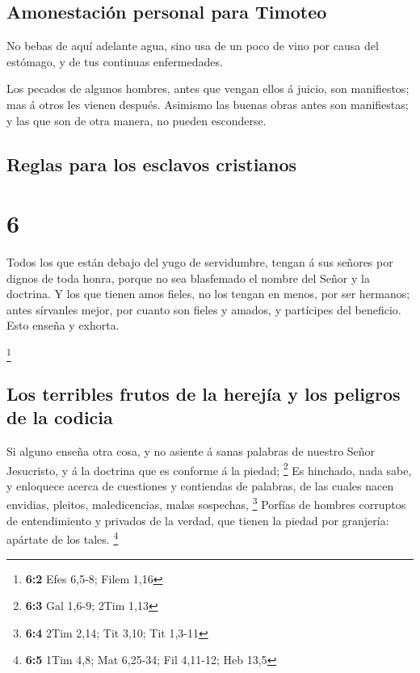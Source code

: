 \hypertarget{amonestaciuxf3n-personal-para-timoteo}{%
\subsection{Amonestación personal para
Timoteo}\label{amonestaciuxf3n-personal-para-timoteo}}

 No bebas de aquí adelante agua, sino usa de un poco de
vino por causa del estómago, y de tus continuas enfermedades.

 Los pecados de algunos hombres, antes que vengan ellos á
juicio, son manifiestos; mas á otros les vienen después. 
Asimismo las buenas obras antes son manifiestas; y las que son de otra
manera, no pueden esconderse.

\hypertarget{reglas-para-los-esclavos-cristianos}{%
\subsection{Reglas para los esclavos
cristianos}\label{reglas-para-los-esclavos-cristianos}}

\hypertarget{section-5}{%
\section{6}\label{section-5}}

 Todos los que están debajo del yugo de servidumbre, tengan
á sus señores por dignos de toda honra, porque no sea blasfemado el
nombre del Señor y la doctrina.  Y los que tienen amos
fieles, no los tengan en menos, por ser hermanos; antes sírvanles mejor,
por cuanto son fieles y amados, y partícipes del beneficio. Esto enseña
y exhorta.

\footnote{\textbf{6:2} Efes 6,5-8; Filem 1,16}

\hypertarget{los-terribles-frutos-de-la-herejuxeda-y-los-peligros-de-la-codicia}{%
\subsection{Los terribles frutos de la herejía y los peligros de la
codicia}\label{los-terribles-frutos-de-la-herejuxeda-y-los-peligros-de-la-codicia}}

 Si alguno enseña otra cosa, y no asiente á sanas palabras
de nuestro Señor Jesucristo, y á la doctrina que es conforme á la
piedad; \footnote{\textbf{6:3} Gal 1,6-9; 2Tim 1,13}  Es
hinchado, nada sabe, y enloquece acerca de cuestiones y contiendas de
palabras, de las cuales nacen envidias, pleitos, maledicencias, malas
sospechas, \footnote{\textbf{6:4} 2Tim 2,14; Tit 3,10; Tit 1,3-11}
 Porfías de hombres corruptos de entendimiento y privados de
la verdad, que tienen la piedad por granjería: apártate de los tales.
\footnote{\textbf{6:5} 1Tim 4,8; Mat 6,25-34; Fil 4,11-12; Heb 13,5}

